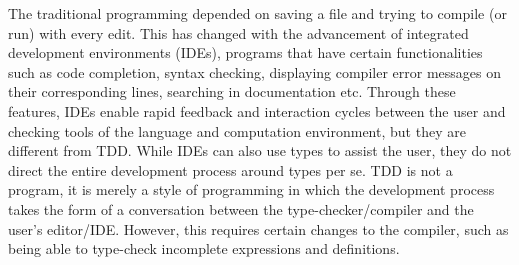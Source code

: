 The traditional programming depended on saving a file and trying to compile (or
run) with every edit. This has changed with the advancement of integrated
development environments (IDEs), programs that have certain functionalities
such as code completion, syntax checking, displaying compiler error messages on
their corresponding lines, searching in documentation etc.
Through these features, IDEs enable rapid feedback and interaction cycles
between the user and checking tools of the language and computation
environment, but they are different from TDD. While IDEs can also use types to
assist the user, they do not direct the entire development process around types
per se.
TDD is not a program, it is merely a style of programming in which
the development process takes the form of a conversation between the
type-checker/compiler and the user's editor/IDE.  However, this requires
certain changes to the compiler, such as being able to type-check incomplete
expressions and definitions.\cite{tdd}

